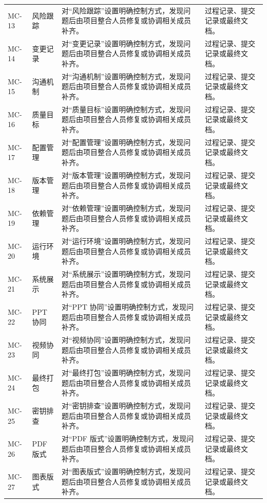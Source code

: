 \documentclass[12pt,a4paper]{ctexart}
\begin{document}
\begin{longtable}{L{1.8cm}L{3.2cm}L{6.4cm}L{4.0cm}}
MC-13 & 风险跟踪 & 对“风险跟踪”设置明确控制方式，发现问题后由项目整合人员修复或协调相关成员补齐。 & 过程记录、提交记录或最终文档。 \\
MC-14 & 变更记录 & 对“变更记录”设置明确控制方式，发现问题后由项目整合人员修复或协调相关成员补齐。 & 过程记录、提交记录或最终文档。 \\
MC-15 & 沟通机制 & 对“沟通机制”设置明确控制方式，发现问题后由项目整合人员修复或协调相关成员补齐。 & 过程记录、提交记录或最终文档。 \\
MC-16 & 质量目标 & 对“质量目标”设置明确控制方式，发现问题后由项目整合人员修复或协调相关成员补齐。 & 过程记录、提交记录或最终文档。 \\
MC-17 & 配置管理 & 对“配置管理”设置明确控制方式，发现问题后由项目整合人员修复或协调相关成员补齐。 & 过程记录、提交记录或最终文档。 \\
MC-18 & 版本管理 & 对“版本管理”设置明确控制方式，发现问题后由项目整合人员修复或协调相关成员补齐。 & 过程记录、提交记录或最终文档。 \\
MC-19 & 依赖管理 & 对“依赖管理”设置明确控制方式，发现问题后由项目整合人员修复或协调相关成员补齐。 & 过程记录、提交记录或最终文档。 \\
MC-20 & 运行环境 & 对“运行环境”设置明确控制方式，发现问题后由项目整合人员修复或协调相关成员补齐。 & 过程记录、提交记录或最终文档。 \\
MC-21 & 系统展示 & 对“系统展示”设置明确控制方式，发现问题后由项目整合人员修复或协调相关成员补齐。 & 过程记录、提交记录或最终文档。 \\
MC-22 & PPT 协同 & 对“PPT 协同”设置明确控制方式，发现问题后由项目整合人员修复或协调相关成员补齐。 & 过程记录、提交记录或最终文档。 \\
MC-23 & 视频协同 & 对“视频协同”设置明确控制方式，发现问题后由项目整合人员修复或协调相关成员补齐。 & 过程记录、提交记录或最终文档。 \\
MC-24 & 最终打包 & 对“最终打包”设置明确控制方式，发现问题后由项目整合人员修复或协调相关成员补齐。 & 过程记录、提交记录或最终文档。 \\
MC-25 & 密钥排查 & 对“密钥排查”设置明确控制方式，发现问题后由项目整合人员修复或协调相关成员补齐。 & 过程记录、提交记录或最终文档。 \\
MC-26 & PDF 版式 & 对“PDF 版式”设置明确控制方式，发现问题后由项目整合人员修复或协调相关成员补齐。 & 过程记录、提交记录或最终文档。 \\
MC-27 & 图表版式 & 对“图表版式”设置明确控制方式，发现问题后由项目整合人员修复或协调相关成员补齐。 & 过程记录、提交记录或最终文档。 \\

\end{longtable}
\end{document}
